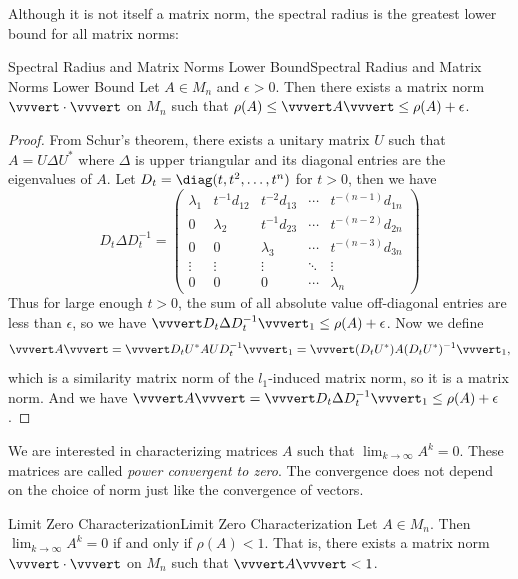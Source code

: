 \documentclass[../main.tex]{subfiles}
\begin{document}
Although it is not itself a matrix norm, the spectral radius is the greatest lower bound for all matrix norms:
\begin{theorem}{Spectral Radius and Matrix Norms Lower Bound}{Spectral Radius and Matrix Norms Lower Bound}
  Let $A \in M_n$ and $\epsilon > 0$. Then there exists a matrix norm $\vvvert \cdot \vvvert$ on $M_n$ such that $\rho(A) \leq \vvvert A \vvvert \leq \rho(A) + \epsilon$.
\end{theorem}
\begin{proof}
  From Schur's theorem, there exists a unitary matrix $U$ such that $A = U \Delta U^*$ where $\Delta$ is upper triangular and its diagonal entries are the eigenvalues of $A$. Let $D_t = \diag(t, t^2, \ldots, t^n)$ for $t > 0$, then we have
  \begin{equation*}
    D_t \Delta D_t^{-1} = \begin{pmatrix}
      \lambda_1 & t^{-1} d_{12} & t^{-2} d_{13} & \cdots & t^{-(n-1)} d_{1n} \\
      0 & \lambda_2 & t^{-1} d_{23} & \cdots & t^{-(n-2)} d_{2n} \\
      0 & 0 & \lambda_3 & \cdots & t^{-(n-3)} d_{3n} \\
      \vdots & \vdots & \vdots & \ddots & \vdots \\
      0 & 0 & 0 & \cdots & \lambda_n
    \end{pmatrix}
  \end{equation*}
  Thus for large enough $t>0$, the sum of all absolute value off-diagonal entries are less than $\epsilon$, so we have $\vvvert D_t \Delta D_t^{-1} \vvvert_1 \leq \rho(A) + \epsilon$. Now we define
  \begin{equation*}
    \vvvert A \vvvert = \vvvert D_t U^* A U D_t^{-1} \vvvert_1 = \vvvert (D_t U^*) A (D_t U^*)^{-1} \vvvert_1,
  \end{equation*}
  which is a similarity matrix norm of the $l_1$-induced matrix norm, so it is a matrix norm. And we have $\vvvert A \vvvert = \vvvert D_t \Delta D_t^{-1} \vvvert_1 \leq \rho(A) + \epsilon$.
\end{proof}

We are interested in characterizing matrices $A$ such that $\lim_{k \to \infty } A^k = 0$. These matrices are called \textit{power convergent to zero}. The convergence does not depend on the choice of norm just like the convergence of vectors.

\begin{theorem}{Limit Zero Characterization}{Limit Zero Characterization}
  Let $A \in M_n$. Then $\lim_{k \to \infty} A^k = 0$ if and only if $\rho(A) < 1$. That is, there exists a matrix norm $\vvvert \cdot \vvvert$ on $M_n$ such that $\vvvert A \vvvert < 1$.
\end{theorem}
\end{document}

